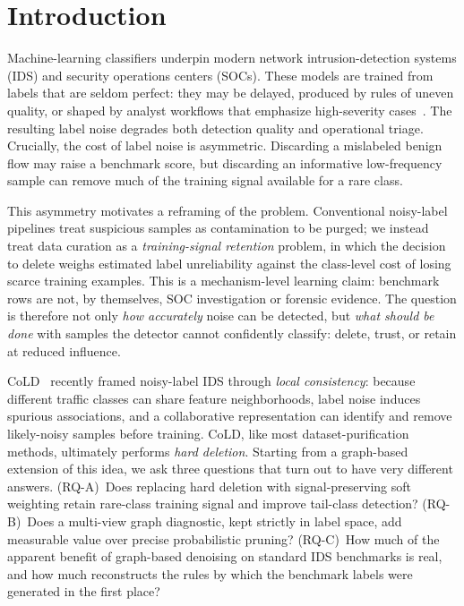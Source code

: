 \documentclass[pdflatex,referee,lineno,sn-basic,Numbered]{sn-jnl}
\begin{document}
\section{Introduction}
\label{sec:intro}
Machine-learning classifiers underpin modern network intrusion-detection systems
(IDS) and security operations centers (SOCs). These models are trained from labels
that are seldom perfect: they may be delayed, produced by rules of uneven quality,
or shaped by analyst workflows that emphasize high-severity cases~\cite{arp2022dodont,song2022survey}.
The resulting label noise degrades both detection quality and operational triage.
Crucially, the cost of label noise is asymmetric. Discarding a mislabeled benign
flow may raise a benchmark score, but discarding an informative low-frequency
sample can remove much of the training signal available for a rare class.

This asymmetry motivates a reframing of the problem. Conventional noisy-label
pipelines treat suspicious samples as contamination to be purged; we instead
treat data curation as a \emph{training-signal retention} problem, in which the
decision to delete weighs estimated label unreliability against the class-level
cost of losing scarce training examples. This is a mechanism-level learning
claim: benchmark rows are not, by themselves, SOC investigation or forensic
evidence. The question is therefore not only \emph{how accurately} noise can be
detected, but \emph{what should be done} with samples the detector cannot
confidently classify: delete, trust, or retain at reduced influence.

CoLD~\cite{yang2026cold} recently framed noisy-label IDS through \emph{local
consistency}: because different traffic classes can share feature neighborhoods,
label noise induces spurious associations, and a collaborative representation can
identify and remove likely-noisy samples before training. CoLD, like most
dataset-purification methods, ultimately performs \emph{hard deletion}. Starting
from a graph-based extension of this idea, we ask three questions that turn out
to have very different answers. (RQ-A)~Does replacing hard deletion with
signal-preserving soft weighting retain rare-class training signal and improve
tail-class detection? (RQ-B)~Does a multi-view graph diagnostic, kept strictly
in label space, add measurable value over precise probabilistic pruning?
(RQ-C)~How much of the apparent benefit of graph-based denoising on standard
IDS benchmarks is real, and how much reconstructs the rules by which the
benchmark labels were generated in the first place?
\end{document}

